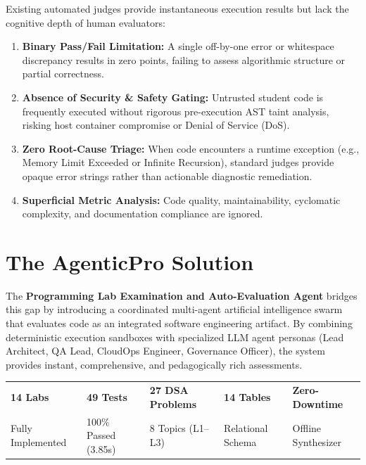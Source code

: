 \documentclass[12pt, a4paper]{report}
\begin{document}
Existing automated judges provide instantaneous execution results but lack the cognitive depth of human evaluators:
\begin{enumerate}[itemsep=2pt,leftmargin=1.5em]
    \item \textbf{Binary Pass/Fail Limitation:} A single off-by-one error or whitespace discrepancy results in zero points, failing to assess algorithmic structure or partial correctness.
    \item \textbf{Absence of Security \& Safety Gating:} Untrusted student code is frequently executed without rigorous pre-execution AST taint analysis, risking host container compromise or Denial of Service (DoS).
    \item \textbf{Zero Root-Cause Triage:} When code encounters a runtime exception (e.g., Memory Limit Exceeded or Infinite Recursion), standard judges provide opaque error strings rather than actionable diagnostic remediation.
    \item \textbf{Superficial Metric Analysis:} Code quality, maintainability, cyclomatic complexity, and documentation compliance are ignored.
\end{enumerate}

\section{The AgenticPro Solution}
The \textbf{Programming Lab Examination and Auto-Evaluation Agent} bridges this gap by introducing a coordinated multi-agent artificial intelligence swarm that evaluates code as an integrated software engineering artifact. By combining deterministic execution sandboxes with specialized LLM agent personas (Lead Architect, QA Lead, CloudOps Engineer, Governance Officer), the system provides instant, comprehensive, and pedagogically rich assessments.

\begin{center}
\renewcommand{\arraystretch}{1.3}
\begin{tabular}{|C{3.0cm}|C{3.0cm}|C{3.0cm}|C{3.0cm}|C{3.0cm}|}
\hline
{}
\textbf{14 Labs} & \textbf{49 Tests} & \textbf{27 DSA Problems} & \textbf{14 Tables} & \textbf{Zero-Downtime} \\
{\footnotesize\color{subtle}Fully Implemented} & 
{\footnotesize\color{successgreen}100\% Passed (3.85s)} & 
{\footnotesize\color{skyaccent}8 Topics (L1--L3)} & 
{\footnotesize\color{subtle}Relational Schema} & 
{\footnotesize\color{brandteal}Offline Synthesizer} \\
\hline
\end{tabular}
\end{center}
\end{document}
